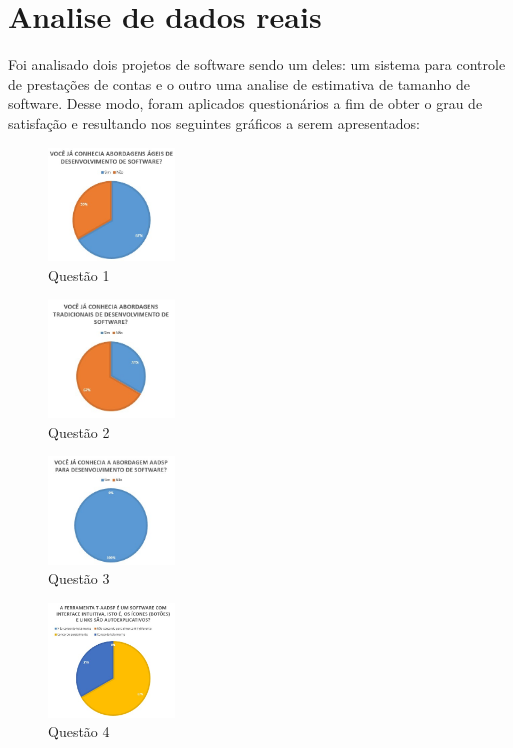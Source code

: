 \documentclass{acm_proc_article-sp}
\begin{document}
\section{Analise de dados reais}
Foi analisado dois projetos de software sendo um deles: um sistema para controle de prestações de contas e o outro uma analise de estimativa de tamanho de software. Desse modo, foram aplicados questionários a fim de obter o grau de satisfação e resultando nos seguintes gráficos a serem apresentados: 


\begin{figure}[!htb]
\centering %
\includegraphics[width=0.3\textwidth]{AV_1.jpg} %
\caption{Questão 1}
\end{figure}

\begin{figure}[!htb]
\centering %
\includegraphics[width=0.3\textwidth]{AV_2.jpg} %
\caption{Questão 2}
\end{figure}

\begin{figure}[!htb]
\centering %
\includegraphics[width=0.3\textwidth]{AV_3.jpg} %
\caption{Questão 3}
\end{figure}

\begin{figure}[!htb]
\centering %
\includegraphics[width=0.3\textwidth]{AV_4.jpg} %
\caption{Questão 4}
\end{figure}
\end{document}

